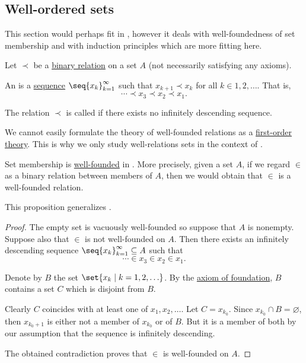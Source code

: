 \subsection{Well-ordered sets}\label{subsec:well_ordered_sets}

This section would perhaps fit in , however it deals with well-foundedness of set membership and with induction principles which are more fitting here.

\begin{definition}\label{def:well_founded_relation}
  Let \( \prec \) be a \hyperref[def:binary_relation]{binary relation} on a set \( A \) (not necessarily satisfying any axioms).

  An  is a \hyperref[def:sequence]{sequence} \( \seq{ x_k }_{k=1}^\infty \) such that \( x_{k+1} \prec x_k \) for all \( k \in 1, 2, \ldots \). That is,
  \begin{equation*}
    \cdots \prec x_3 \prec x_2 \prec x_1.
  \end{equation*}

  The relation \( \prec \) is called  if there exists no infinitely descending sequence.

  We cannot easily formulate the theory of well-founded relations as a \hyperref[def:first_order_theory]{first-order theory}. This is why we only study well-relations sets in the context of .
\end{definition}

\begin{proposition}\label{thm:set_membership_is_well_founded}
  Set membership is \hyperref[def:well_founded_relation]{well-founded} in . More precisely, given a set \( A \), if we regard \( \in \) as a binary relation between members of \( A \), then we would obtain that \( \in \) is a well-founded relation.

  This proposition generalizes .
\end{proposition}
\begin{proof}
  The empty set is vacuously well-founded so suppose that \( A \) is nonempty. Suppose also that \( \in \) is not well-founded on \( A \). Then there exists an infinitely descending sequence \( \seq{ x_k }_{k=1}^\infty \subseteq A \) such that
  \begin{equation*}
    \cdots \in x_3 \in x_2 \in x_1.
  \end{equation*}

  Denote by \( B \) the set \( \set{ x_k \given k = 1, 2, \ldots } \). By the \hyperref[def:zfc/foundation]{axiom of foundation}, \( B \) contains a set \( C \) which is disjoint from \( B \).

  Clearly \( C \) coincides with at least one of \( x_1, x_2, \ldots \). Let \( C = x_{k_0} \). Since \( x_{k_0} \cap B = \varnothing \), then \( x_{k_0 + 1} \) is either not a member of \( x_{k_0} \) or of \( B \). But it is a member of both by our assumption that the sequence is infinitely descending.

  The obtained contradiction proves that \( \in \) is well-founded on \( A \).
\end{proof}

